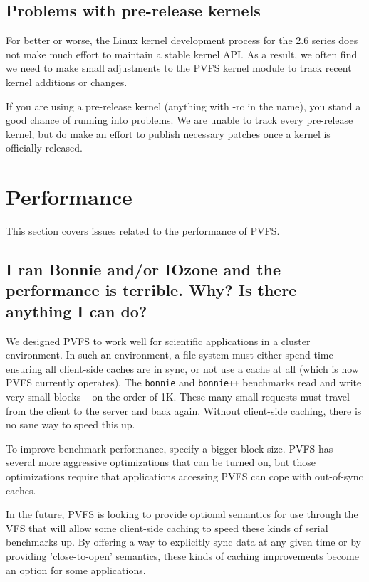 \documentclass[11pt,letterpaper]{article}
\begin{document}
\subsection{Problems with pre-release kernels}
\label{sec:rc-kernels}

For better or worse, the Linux kernel development process for the 2.6 series
does not make much effort to maintain a stable kernel API.  As a result, we
often find we need to make small adjustments to the PVFS kernel module to track
recent kernel additions or changes.  

If you are using a pre-release kernel (anything with -rc in the name), you
stand a good chance of running into problems.  We are unable to track every
pre-release kernel, but do make an effort to publish necessary patches once a
kernel is officially released. 

%
%
\section{Performance}

This section covers issues related to the performance of PVFS.

\subsection{I ran Bonnie and/or IOzone and the performance is terrible.
Why? Is there anything I can do?}
\label{sec:badperf}

We designed PVFS to work well for scientific applications in a cluster
environment.  In such an environment, a file system must either spend
time ensuring all client-side caches are in sync, or not use a cache
at all (which is how PVFS currently operates).  The \texttt{bonnie}
and \texttt{bonnie++} benchmarks read and write very small blocks --
on the order of 1K.  These many small requests must travel from the
client to the server and back again.  Without client-side caching,
there is no sane way to speed this up.

To improve benchmark performance, specify a bigger block size.   PVFS
has several more aggressive optimizations that can be turned on, but
those optimizations require that applications accessing PVFS can cope
with out-of-sync caches.  

In the future, PVFS is looking to provide optional semantics for use
through the VFS that will allow some client-side caching to speed these
kinds of serial benchmarks up.  By offering a way to explicitly sync
data at any given time or by providing 'close-to-open' semantics, these
kinds of caching improvements become an option for some applications.
\end{document}
